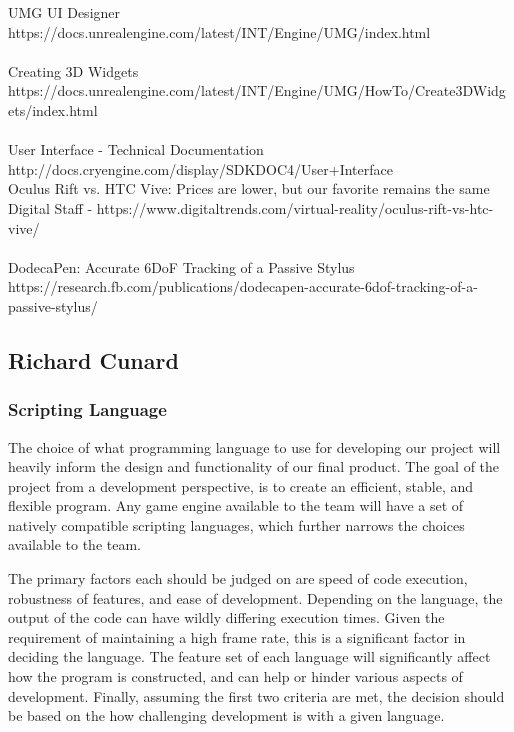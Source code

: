 \documentclass[onecolumn, draftclsnofoot,10pt, compsoc]{IEEEtran}
\newcounter{threesection}[subsubsection]
\begin{document}
UMG UI Designer\\
https://docs.unrealengine.com/latest/INT/Engine/UMG/index.html \\ \\


Creating 3D Widgets \\
https://docs.unrealengine.com/latest/INT/Engine/UMG/HowTo/Create3DWidgets/index.html \\ \\

User Interface - Technical Documentation \\
http://docs.cryengine.com/display/SDKDOC4/User+Interface \\

Oculus Rift vs. HTC Vive: Prices are lower, but our favorite remains the same \\
Digital Staff - https://www.digitaltrends.com/virtual-reality/oculus-rift-vs-htc-vive/ \\ \\

DodecaPen: Accurate 6DoF Tracking of a Passive Stylus \\
https://research.fb.com/publications/dodecapen-accurate-6dof-tracking-of-a-passive-stylus/ \\

\pagebreak
\subsection{Richard Cunard}

{}

\subsubsection{Scripting Language}

The choice of what programming language to use for developing our project will heavily inform the design and functionality of our final product. The goal of the project from a development perspective, is to create an efficient, stable, and flexible program. Any game engine available to the team will have a set of natively compatible scripting languages, which further narrows the choices available to the team.

The primary factors each should be judged on are speed of code execution, robustness of features, and ease of development. Depending on the language, the output of the code can have wildly differing execution times. Given the requirement of maintaining a high frame rate, this is a significant factor in deciding the language. The feature set of each language will significantly affect how the program is constructed, and can help or hinder various aspects of development. Finally, assuming the first two criteria are met, the decision should be based on the how challenging development is with a given language.
\end{document}
